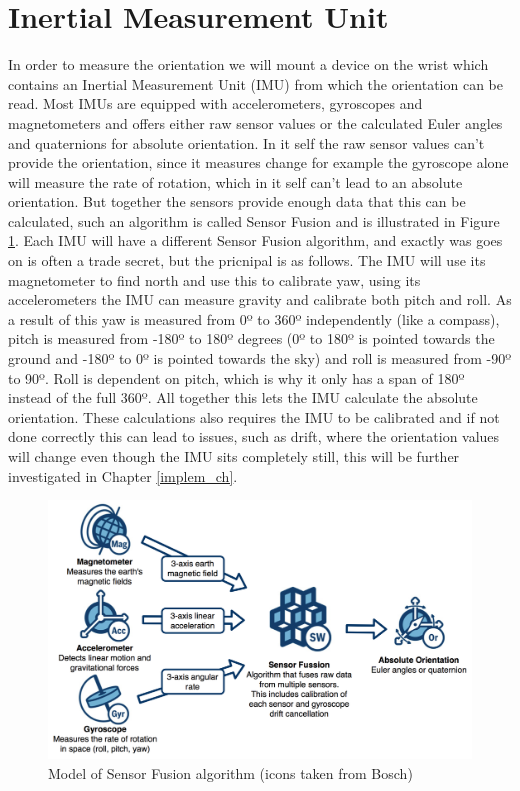 \section{Inertial Measurement Unit}
In order to measure the orientation we will mount a device on the wrist which contains an Inertial Measurement Unit (IMU) from which the orientation can be read. Most IMUs are equipped with accelerometers, gyroscopes and magnetometers and offers either raw sensor values or the calculated Euler angles and quaternions for absolute orientation. In it self the raw sensor values can't provide the orientation, since it measures change for example the gyroscope alone will measure the rate of rotation, which in it self can't lead to an absolute orientation. But together the sensors provide enough data that this can be calculated, such an algorithm is called Sensor Fusion and is illustrated in Figure \ref{sensor_fusion}. Each IMU will have a different Sensor Fusion algorithm, and exactly was goes on is often a trade secret, but the pricnipal is as follows. The IMU will use its magnetometer to find north and use this to calibrate yaw, using its accelerometers the IMU can measure gravity and calibrate both pitch and roll. As a result of this yaw is measured from 0º to 360º independently (like a compass), pitch is measured from -180º to 180º degrees (0º to 180º is pointed towards the ground and -180º to 0º is pointed towards the sky) and roll is measured from -90º to 90º. Roll is dependent on pitch, which is why it only has a span of 180º instead of the full 360º. All together this lets the IMU calculate the absolute orientation. These calculations also requires the IMU to be calibrated and if not done correctly this can lead to issues, such as drift, where the orientation values will change even though the IMU sits completely still, this will be further investigated in Chapter \ref{implem_ch}. 


\begin{figure}[h!]
    \centering
    \includegraphics[width=1\textwidth]{figures/SensorFusion.png}
    \caption{Model of Sensor Fusion algorithm (icons taken from Bosch\cite{bosch})}
    \label{sensor_fusion}
\end{figure}


